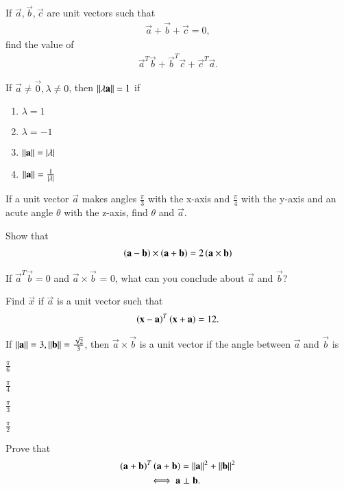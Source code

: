 \item If $\vec{a},\vec{b},\vec{c}$ are unit vectors such that 
\begin{align}
\vec{a}+\vec{b}+\vec{c} = 0,
\end{align}
find the value of 
\begin{align}
\vec{a}^T\vec{b}+\vec{b}^T\vec{c}+\vec{c}^T\vec{a}.
\end{align}
\item If $\vec{a} \ne \vec{0}, \lambda \ne 0$, then $\left\lVert\lambda \mathbf{a}\right\rVert = 1$ if
\begin{enumerate}
\item $\lambda =1$
\item $\lambda = -1$
\item $\left\lVert\mathbf{a}\right\rVert=\left\vert\lambda\right\vert$
\item $\left\lVert\mathbf{a}\right\rVert=\frac{1}{\left\vert\lambda\right\vert}$
\end{enumerate}
\item If a unit vector $\vec{a}$ makes angles $\frac{\pi}{3}$ with the x-axis and $\frac{\pi}{4}$ with the y-axis and an acute angle $\theta$ with the z-axis, find $\theta$ and $\vec{a}$.
\item Show that 
\begin{align}
\left(\mathbf{a}-\mathbf{b}\right)\times \left(\mathbf{a}+\mathbf{b}\right) = 2\left(\mathbf{a}\times\mathbf{b}\right)
\end{align}
\item If $\vec{a}^T\vec{b} = 0$ and $\vec{a}\times \vec{b}$ = 0, what can you conclude about $\vec{a}$ and $\vec{b}$?
\item Find $\vec{x}$ if  $\vec{a}$ is a unit vector such that
\begin{align}
\left(\mathbf{x}-\mathbf{a}\right)^T\left(\mathbf{x}+\mathbf{a}\right) = 12.
\end{align}
\item If $\left\lVert\mathbf{a}\right\rVert = 3, \left\lVert\mathbf{b}\right\rVert =\frac{\sqrt{2}}{3}$, then $\vec{a}\times \vec{b}$ is a unit vector if the angle between $\vec{a}$ and $\vec{b}$ is 
\begin{enumerate}[itemsep = 2pt]
\begin{multicols}{2}
\item $\frac{\pi}{6}$
\item $\frac{\pi}{4}$
\item $\frac{\pi}{3}$
\item $\frac{\pi}{2}$
\end{multicols}
\end{enumerate}
\item Prove that 
\begin{align}
\left(\mathbf{a}+\mathbf{b}\right)^T\left(\mathbf{a}+\mathbf{b}\right) &= \left\lVert\mathbf{a}\right\rVert^2+\left\lVert\mathbf{b}\right\rVert^2
\\
\iff \mathbf{a}&\perp\mathbf{b}.
\end{align}
